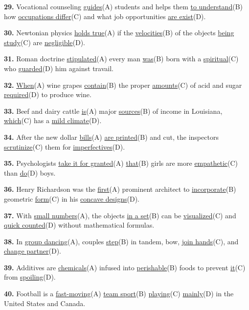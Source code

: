 \documentclass[12pt]{article}
\begin{document}
\vspace{\questionblockgap}
\noindent\textbf{29.} Vocational counseling \uline{guides}(A) students and helps them \uline{to understand}(B) how \uline{occupations differ}(C) and what job opportunities \uline{are exist}(D).
\par
\vspace{\questionblockgap}
\noindent\textbf{30.} Newtonian physics \uline{holds true}(A) if the \uline{velocities}(B) of the objects \uline{being study}(C) are \uline{negligible}(D).
\par
\vspace{\questionblockgap}
\noindent\textbf{31.} Roman doctrine \uline{stipulated}(A) every man \uline{was}(B) born with a \uline{spiritual}(C) who \uline{guarded}(D) him against travail.
\par
\vspace{\questionblockgap}
\noindent\textbf{32.} \uline{When}(A) wine grapes \uline{contain}(B) the proper \uline{amounts}(C) of acid and sugar \uline{required}(D) to produce wine.
\par
\vspace{\questionblockgap}
\noindent\textbf{33.} Beef and dairy cattle \uline{is}(A) major \uline{sources}(B) of income in Louisiana, \uline{which}(C) has a \uline{mild climate}(D).
\par
\vspace{\questionblockgap}
\noindent\textbf{34.} After the new dollar \uline{bills}(A) \uline{are printed}(B) and cut, the inspectors \uline{scrutinize}(C) them for \uline{imperfectives}(D).
\par
\vspace{\questionblockgap}
\noindent\textbf{35.} Psychologists \uline{take it for granted}(A) \uline{that}(B) girls are more \uline{empathetic}(C) than \uline{do}(D) boys.
\par
\vspace{\questionblockgap}
\noindent\textbf{36.} Henry Richardson was the \uline{first}(A) prominent architect to \uline{incorporate}(B) geometric \uline{form}(C) in his \uline{concave designs}(D).
\par
\vspace{\questionblockgap}
\noindent\textbf{37.} With \uline{small numbers}(A), the objects \uline{in a set}(B) can be \uline{visualized}(C) and \uline{quick counted}(D) without mathematical formulas.
\par
\vspace{\questionblockgap}
\noindent\textbf{38.} In \uline{group dancing}(A), couples \uline{step}(B) in tandem, bow, \uline{join hands}(C), and \uline{change partner}(D).
\par
\vspace{\questionblockgap}
\noindent\textbf{39.} Additives are \uline{chemicals}(A) infused into \uline{perishable}(B) foods to prevent \uline{it}(C) from \uline{spoiling}(D).
\par
\vspace{\questionblockgap}
\noindent\textbf{40.} Football is a \uline{fast-moving}(A) \uline{team sport}(B) \uline{playing}(C) \uline{mainly}(D) in the United States and Canada.
\par
\vspace{\questionblockgap}
\end{document}
